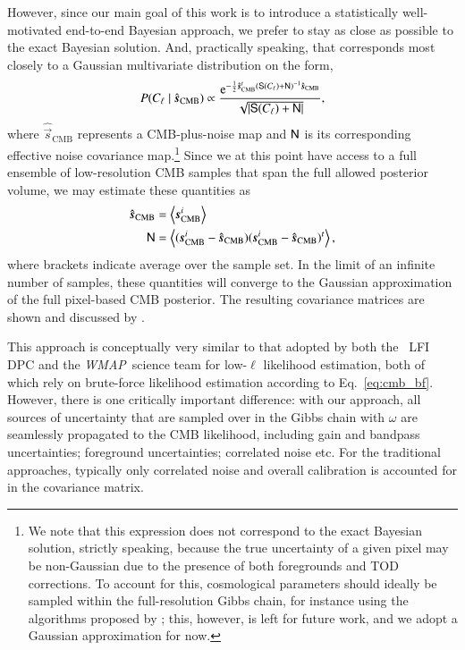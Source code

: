 \documentclass[twocolumn]{aa}
\def\WMAP{\emph{WMAP}}
\newcommand{\s}[0]{\vec{s}}
\newcommand{\N}[0]{\tens{N}}
\renewcommand{\S}[0]{\tens{S}}
\newcommand{\e}{\mathrm e}
\begin{document}
However, since our main goal of this work is to introduce a
statistically well-motivated end-to-end Bayesian approach, we prefer to stay as
close as possible to the exact Bayesian solution. And, practically
speaking, that corresponds most closely to a Gaussian multivariate
distribution on the form,
\begin{equation}
P(C_{\ell}\mid \hat{\s}_{\mathrm{CMB}}) \propto
\frac{\e^{-\frac{1}{2}\hat{\s}^t_{\mathrm{CMB}}\left(\S(C_{\ell}) +
  \N\right)^{-1}\hat{\s}_{\mathrm{CMB}}}}{\sqrt{|\S(C_{\ell})+\N|}},
\label{eq:cmb_bf}
\end{equation}
where $\hat{\s}_{\mathrm{CMB}}$ represents a CMB-plus-noise map and $\N$ is its
corresponding effective noise covariance map.\footnote{We note that this
  expression does not correspond to the exact Bayesian solution,
  strictly speaking, because the true uncertainty of a given pixel may
  be non-Gaussian due to the presence of both foregrounds and TOD
  corrections. To account for this, cosmological parameters should
  ideally be sampled within the full-resolution Gibbs chain, for
  instance using the algorithms proposed by \citet{racine:2016}; this,
  however, is left for future work, and we adopt a Gaussian
  approximation for now.} Since we at this point have access to a
full ensemble of low-resolution CMB samples that span the full allowed
posterior volume, we may estimate these quantities as 
\begin{align}
  \hat{\s}_{\mathrm{CMB}} &= \left<\s_{\mathrm{CMB}}^i\right>\\
  \N &=
  \left<(\s^i_{\mathrm{CMB}}-\hat{\s}_{\mathrm{CMB}})(\s^i_{\mathrm{CMB}}-\hat{\s}_{\mathrm{CMB}})^t\right>,
  \label{eq:cmb_lowl_input}
\end{align}
where brackets indicate average over the sample set. In the limit of
an infinite number of samples, these quantities will converge to the
Gaussian approximation of the full pixel-based CMB posterior. The
resulting covariance matrices are shown and discussed by \citet{bp11}.

This approach is conceptually very similar to that adopted by both the
\Planck\ LFI DPC \citet{planck2016-l05} and the \WMAP\ science team
\citet{hinshaw2012} for low-$\ell$ likelihood estimation, both of
which rely on brute-force likelihood estimation according to
Eq.~\eqref{eq:cmb_bf}. However, there is one critically important
difference: with our approach, all sources of uncertainty that are
sampled over in the Gibbs chain with $\omega$ are seamlessly
propagated to the CMB likelihood, including gain and bandpass
uncertainties; foreground uncertainties; correlated noise etc. For the
traditional approaches, typically only correlated noise and overall
calibration is accounted for in the covariance matrix.
\end{document}
